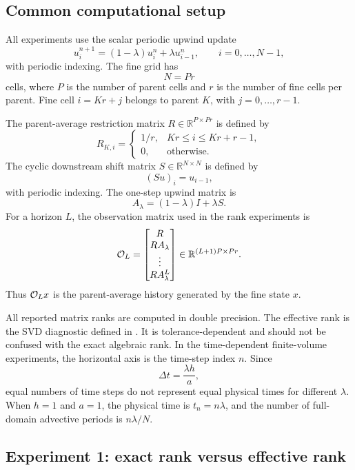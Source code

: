 \documentclass[preprint,12pt]{elsarticle}
\theoremstyle{plain}
\theoremstyle{remark}
\theoremstyle{definition}
\begin{document}
\subsection{Common computational setup}

All experiments use the scalar periodic upwind update
\[
  u_i^{n+1}
  =
  (1-\lambda)u_i^n+\lambda u_{i-1}^n,
  \qquad i=0,\ldots,N-1,
\]
with periodic indexing.  The fine grid has
\[
  N=Pr
\]
cells, where \(P\) is the number of parent cells and \(r\) is the number of
fine cells per parent.  Fine cell \(i=Kr+j\) belongs to parent \(K\), with
\(j=0,\ldots,r-1\).

The parent-average restriction matrix \(R\in\mathbb R^{P\times Pr}\) is
defined by
\[
  R_{K,i}
  =
  \begin{cases}
  1/r, & Kr\le i\le Kr+r-1,\\
  0, & \text{otherwise}.
  \end{cases}
\]
The cyclic downstream shift matrix \(S\in\mathbb R^{N\times N}\) is defined
by
\[
  (Su)_i=u_{i-1},
\]
with periodic indexing.  The one-step upwind matrix is
\[
  A_\lambda=(1-\lambda)I+\lambda S.
\]
For a horizon \(L\), the observation matrix used in the rank experiments is
\[
  {\cal O}_L
  =
  \begin{bmatrix}
  R\\
  RA_\lambda\\
  \vdots\\
  RA_\lambda^L
  \end{bmatrix}
  \in
  \mathbb R^{(L+1)P\times Pr}.
\]
Thus \({\cal O}_Lx\) is the parent-average history generated by the fine
state \(x\).

All reported matrix ranks are computed in double precision.  The effective
rank is the SVD diagnostic defined in
.  It is tolerance-dependent and should not
be confused with the exact algebraic rank.  In the time-dependent
finite-volume experiments, the horizontal axis is the time-step index \(n\).
Since
\[
  \Delta t=\frac{\lambda h}{a},
\]
equal numbers of time steps do not represent equal physical times for
different \(\lambda\).  When \(h=1\) and \(a=1\), the physical time is
\(t_n=n\lambda\), and the number of full-domain advective periods is
\(n\lambda/N\).

\subsection{Experiment 1: exact rank versus effective rank}
\end{document}

